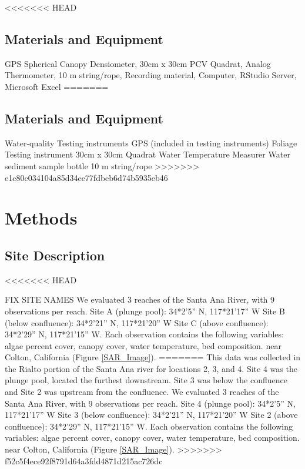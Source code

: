 \documentclass{article}\usepackage[]{graphicx}\usepackage[]{color}
\begin{document}
<<<<<<< HEAD
\subsection{Materials and Equipment} 
GPS Spherical Canopy Densiometer, 30cm x 30cm PCV Quadrat, Analog Thermometer, 10 m string/rope, Recording material, Computer, RStudio Server, Microsoft Excel
=======
\subsection{Materials and Equipment}

Water-quality Testing instruments GPS (included in testing instruments) Foliage Testing instrument 30cm x 30cm Quadrat Water Temperature Measurer Water sediment sample bottle 10 m string/rope
>>>>>>> e1c80c034104a85d34ee77fdbeb6d74b5935eb46


\section{Methods}


\subsection{Site Description}
<<<<<<< HEAD

FIX SITE NAMES
We evaluated 3 reaches of the Santa Ana River, with 9 observations per reach. Site A (plunge pool): 34*2’5” N, 117*21’17” W Site B (below conﬂuence): 34*2’21” N, 117*21’20” W Site C (above conﬂuence): 34*2’29” N, 117*21’15” W. Each observation contains the following variables: algae percent cover, canopy cover, water temperature, bed composition. near Colton, California (Figure \ref{SAR_Image}). 
=======
This data was collected in the Rialto portion of the Santa Ana river for locations 2, 3, and 4. Site 4 was the plunge pool, located the furthest downstream. Site 3 was below the confluence and Site 2 was upstream from the confluence. 
We evaluated 3 reaches of the Santa Ana River, with 9 observations per reach. Site 4 (plunge pool): 34*2’5” N, 117*21’17” W Site 3 (below conﬂuence): 34*2’21” N, 117*21’20” W Site 2 (above conﬂuence): 34*2’29” N, 117*21’15” W. Each observation contains the following variables: algae percent cover, canopy cover, water temperature, bed composition. near Colton, California (Figure \ref{SAR_Image}). 
>>>>>>> f52c5f4ece92f8791d64a3fdd4871d215ac726dc
\end{document}
